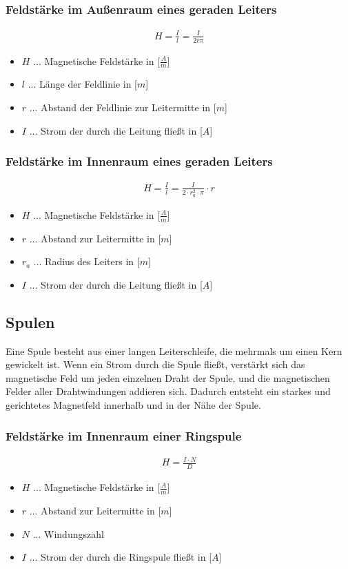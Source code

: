 \subsubsection*{Feldstärke im Außenraum eines geraden Leiters}
\begin{align}
    H = \frac{I}{l} = \frac{I}{2r\pi}
\end{align}

\begin{itemize}
    \item $H$ ... Magnetische Feldstärke in [$\frac{A}{m}$]
    \item $l$ ... Länge der Feldlinie in [$m$]
    \item $r$ ... Abstand der Feldlinie zur Leitermitte in [$m$]
    \item $I$ ... Strom der durch die Leitung fließt in [$A$]
\end{itemize}

\subsubsection*{Feldstärke im Innenraum eines geraden Leiters}
\begin{align}
    H = \frac{I}{l} = \frac{I}{2\cdot r_{a}^{2}\cdot \pi} \cdot r    
\end{align}
\begin{itemize}
    \item $H$ ... Magnetische Feldstärke in [$\frac{A}{m}$]
    \item $r$ ... Abstand zur Leitermitte in [$m$]
    \item $r_{a}$ ... Radius des Leiters in [$m$]
    \item $I$ ... Strom der durch die Leitung fließt in [$A$]
\end{itemize}

\subsection{Spulen}
Eine Spule besteht aus einer langen Leiterschleife, die mehrmals um einen Kern gewickelt ist. Wenn ein Strom durch die Spule fließt, verstärkt sich das magnetische Feld um jeden einzelnen Draht der Spule, und die magnetischen Felder aller Drahtwindungen addieren sich. Dadurch entsteht ein starkes und gerichtetes Magnetfeld innerhalb und in der Nähe der Spule.

\subsubsection*{Feldstärke im Innenraum einer Ringspule}
\begin{align}
    H = \frac{I\cdot N}{D}
\end{align}
\begin{itemize}
    \item $H$ ... Magnetische Feldstärke in [$\frac{A}{m}$]
    \item $r$ ... Abstand zur Leitermitte in [$m$]
    \item $N$ ... Windungszahl
    \item $I$ ... Strom der durch die Ringspule fließt in [$A$]
\end{itemize}

